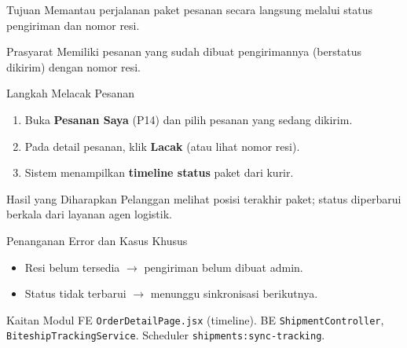 
\begin{flowsection}{Tujuan}
Memantau perjalanan paket pesanan secara langsung melalui status pengiriman dan
nomor resi.
\end{flowsection}

\begin{flowsection}{Prasyarat}
Memiliki pesanan yang sudah dibuat pengirimannya (berstatus dikirim) dengan
nomor resi.
\end{flowsection}

\begin{flowsection}{Langkah Melacak Pesanan}
\begin{enumerate}
  \item Buka \textbf{Pesanan Saya} (P14) dan pilih pesanan yang sedang dikirim.
  \item Pada detail pesanan, klik \textbf{Lacak} (atau lihat nomor resi).
  \item Sistem menampilkan \textbf{timeline status} paket dari kurir.
\end{enumerate}
\end{flowsection}


\begin{flowsection}{Hasil yang Diharapkan}
Pelanggan melihat posisi terakhir paket; status diperbarui berkala dari layanan
agen logistik.
\end{flowsection}

\begin{flowsection}{Penanganan Error dan Kasus Khusus}
\begin{itemize}
  \item Resi belum tersedia $\rightarrow$ pengiriman belum dibuat admin.
  \item Status tidak terbarui $\rightarrow$ menunggu sinkronisasi berikutnya.
\end{itemize}
\end{flowsection}

\begin{flowsection}{Kaitan Modul}
FE \texttt{OrderDetailPage.jsx} (timeline). BE \texttt{ShipmentController},
\texttt{BiteshipTrackingService}. Scheduler \texttt{shipments:sync-tracking}.
\end{flowsection}

